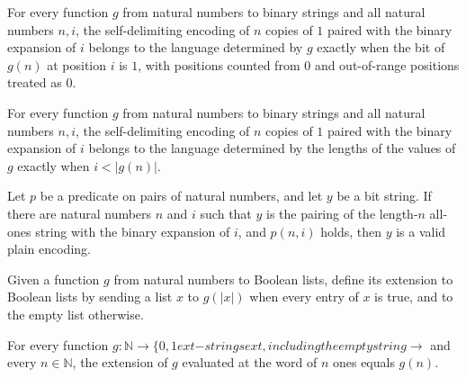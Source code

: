\begin{lemma}
\label{Complexity.mem_uBit}
\leanok
{}
For every function $g$ from natural numbers to binary strings and all natural numbers
$n,i$, the self-delimiting encoding of $n$ copies of $1$ paired with the binary
expansion of $i$ belongs to the language determined by $g$ exactly when the bit of
$g(n)$ at position $i$ is $1$, with positions counted from $0$ and out-of-range
positions treated as $0$.
\end{lemma}

\begin{lemma}
\label{Complexity.mem_uLen}
\leanok
{}
For every function $g$ from natural numbers to binary strings and all natural numbers
$n,i$, the self-delimiting encoding of $n$ copies of $1$ paired with the binary
expansion of $i$ belongs to the language determined by the lengths of the values of $g$
exactly when $i<|g(n)|$.
\end{lemma}

\begin{lemma}
\label{Complexity.validPlain_of_mem_unaryIdx}
\leanok
{}
Let $p$ be a predicate on pairs of natural numbers, and let $y$ be a bit string. If
there are natural numbers $n$ and $i$ such that $y$ is the pairing of the length-$n$
all-ones string with the binary expansion of $i$, and $p(n,i)$ holds, then $y$ is a
valid plain encoding.
\end{lemma}

\begin{definition}
\label{Complexity.unaryExt}
\leanok
Given a function $g$ from natural numbers to Boolean lists, define its extension to
Boolean lists by sending a list $x$ to $g(|x|)$ when every entry of $x$ is true, and to
the empty list otherwise.
\end{definition}

\begin{lemma}
\label{Complexity.unaryExt_replicate}
\leanok
{}
For every function $g:\mathbb N\to\{0,1	ext{-strings}	ext{, including the empty
string}\rightarrow$ and every $n\in\mathbb N$, the extension of $g$ evaluated at the word
of $n$ ones equals $g(n)$.
\end{lemma}

